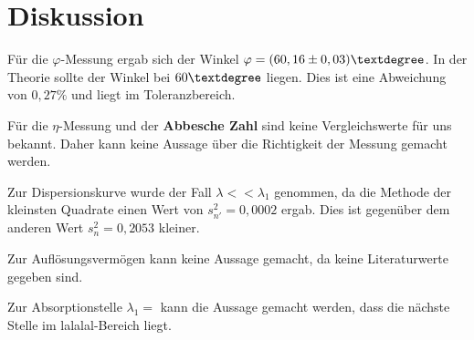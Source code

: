 \section{Diskussion}
Für die $\varphi$-Messung ergab sich der Winkel $\varphi = (60,16\pm0,03)\textdegree$.
In der Theorie sollte der Winkel bei $60 \textdegree$ liegen. Dies ist eine Abweichung
von $0,27 \%$ und liegt im Toleranzbereich.

Für die $\eta$-Messung und der \textbf{Abbesche Zahl} sind keine Vergleichswerte
für uns bekannt. Daher kann keine Aussage über die Richtigkeit der Messung gemacht werden.

Zur Dispersionskurve wurde der Fall $\lambda << \lambda_1$ genommen, da die
Methode der kleinsten Quadrate einen Wert von $s^2_{n'} = 0,0002$ ergab. Dies
ist gegenüber dem anderen Wert $s^2_n = 0,2053$ kleiner.

Zur Auflösungsvermögen kann keine Aussage gemacht, da keine Literaturwerte gegeben sind.

Zur Absorptionstelle $\lambda_1 =$ kann die Aussage gemacht werden, dass die
nächste Stelle im lalalal-Bereich liegt.
